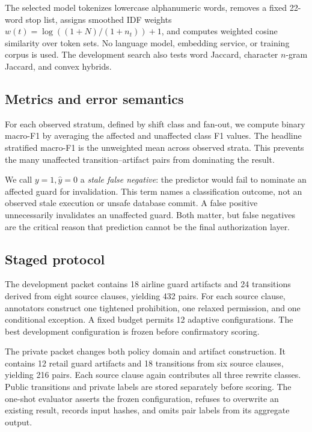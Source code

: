 \documentclass{article}
\begin{document}
The selected model tokenizes lowercase alphanumeric words, removes a fixed 22-word stop list, assigns smoothed IDF weights $w(t)=\log((1+N)/(1+n_t))+1$, and computes weighted cosine similarity over token sets. No language model, embedding service, or training corpus is used. The development search also tests word Jaccard, character $n$-gram Jaccard, and convex hybrids.

\subsection{Metrics and error semantics}

For each observed stratum, defined by shift class and fan-out, we compute binary macro-F1 by averaging the affected and unaffected class F1 values. The headline stratified macro-F1 is the unweighted mean across observed strata. This prevents the many unaffected transition--artifact pairs from dominating the result.

We call $y=1,\hat y=0$ a \emph{stale false negative}: the predictor would fail to nominate an affected guard for invalidation. This term names a classification outcome, not an observed stale execution or unsafe database commit. A false positive unnecessarily invalidates an unaffected guard. Both matter, but false negatives are the critical reason that prediction cannot be the final authorization layer.

\subsection{Staged protocol}

The development packet contains 18 airline guard artifacts and 24 transitions derived from eight source clauses, yielding 432 pairs. For each source clause, annotators construct one tightened prohibition, one relaxed permission, and one conditional exception. A fixed budget permits 12 adaptive configurations. The best development configuration is frozen before confirmatory scoring.

The private packet changes both policy domain and artifact construction. It contains 12 retail guard artifacts and 18 transitions from six source clauses, yielding 216 pairs. Each source clause again contributes all three rewrite classes. Public transitions and private labels are stored separately before scoring. The one-shot evaluator asserts the frozen configuration, refuses to overwrite an existing result, records input hashes, and omits pair labels from its aggregate output.
\end{document}
